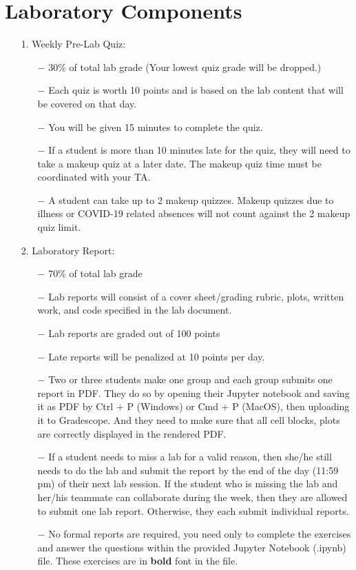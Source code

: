 \documentclass[letterpaper, 11pt]{article}
\begin{document}
\newpage
\section*{Laboratory Components}
\begin{enumerate}
\item[1.] Weekly Pre-Lab Quiz:
\begin{itemize}
\item[$-$] 30\% of total lab grade (Your lowest quiz grade will be dropped.)
\item[$-$] Each quiz is worth 10 points and is based on the lab content that will be covered on that day.
\item[$-$] You will be given 15 minutes to complete the quiz.
\item[$-$] If a student is more than 10 minutes late for the quiz, they will need to take a makeup quiz at a later date. The makeup quiz time must be coordinated with your TA. 
\item[$-$] A student can take up to 2 makeup quizzes. Makeup quizzes due to illness or COVID-19 related absences will not count against the 2 makeup quiz limit.
\end{itemize}
\item[2.] Laboratory Report:
\begin{itemize}
\item[$-$] 70\% of total lab grade
\item[$-$] Lab reports will consist of a cover sheet/grading rubric, plots, written work, and code specified in the lab document.
\item[$-$] Lab reports are graded out of 100 points
\item[$-$] Late reports will be penalized at 10 points per day.
\item[$-$] Two or three students make one group and each group submits one report in PDF. They do so by opening their Jupyter notebook and saving it as PDF by Ctrl + P (Windows) or Cmd + P (MacOS), then uploading it to Gradescope. And they need to make sure that all cell blocks, plots are correctly displayed in the rendered PDF.
\item[$-$] If a student needs to miss a lab for a valid reason, then she/he still needs to do the lab and submit the report by the end of the day (11:59 pm) of their next lab session. 
If the student who is missing the lab and her/his teammate can collaborate during the week, then they are allowed to submit one lab report. Otherwise, they each submit individual reports.
\item[$-$] No formal reports are required, you need only to complete the exercises and answer the questions within the provided Jupyter Notebook (.ipynb) file. These exercises are in \textbf{bold} font in the file.

\end{itemize}
\end{enumerate}
\end{document}
